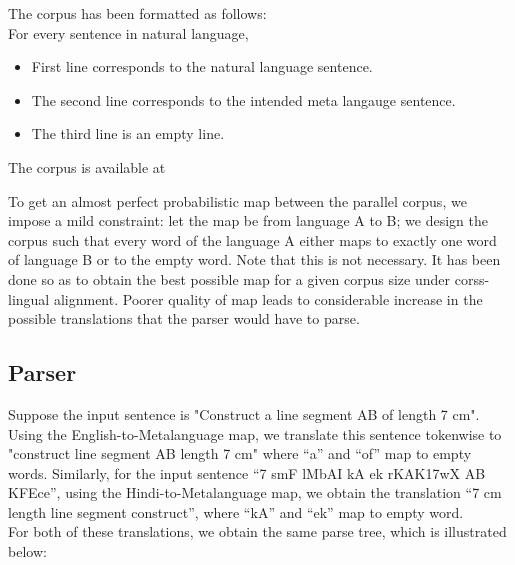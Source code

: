 \def\DevnagVersion{2.15}\documentclass[12pt]{article}
\begin{document}
The corpus has been formatted as follows:\\
For every sentence in natural language, 
\begin{itemize}
\item First line corresponds to the natural language sentence.
\item The second line corresponds to the intended meta langauge sentence.
\item The third line is an empty line.
\end{itemize}
The corpus is available at \cite{corpus}

To get an almost perfect probabilistic map between the parallel corpus, we impose a mild constraint: let the map be from language A to B; we design the corpus such that every word of the language A either maps to exactly one word of language B or to the empty word. Note that this is not necessary. It has been done so as to obtain the best possible map for a given corpus size under corss-lingual alignment. Poorer quality of map leads to considerable increase in the possible translations that the parser would have to parse.

\subsection{Parser}
Suppose the input sentence is "Construct a line segment AB of length 7 cm". Using the English-to-Metalanguage map, we translate this sentence tokenwise to "construct line segment AB length 7 cm" where ``a'' and ``of'' map to empty words. Similarly, for the input sentence ``7 {\dn s\?mF lMbAI kA ek r\?KAK\317wX} AB {\dn KF{\qva}Ece}'', using the Hindi-to-Metalanguage map, we obtain the translation ``7 cm length line segment construct'', where ``{\dn kA}'' and ``{\dn ek}'' map to empty word.\\

For both of these translations, we obtain the same parse tree, which is illustrated below:
\end{document}
